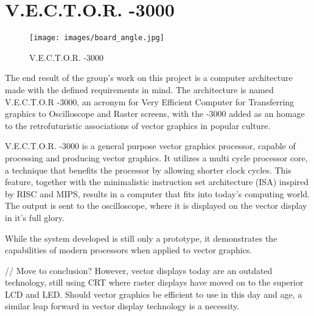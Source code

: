 \chapter{V.E.C.T.O.R. -3000}

\begin{figure}[H]
    \centering \texttt{[image: images/board\_angle.jpg]}
    \caption{V.E.C.T.O.R. -3000}
    \label{fig:board-angle}
\end{figure}

The end result of the group's work on this project is a computer architecture made with the defined requirements in mind.
The architecture is named V.E.C.T.O.R -3000, an acronym for Very Efficient Computer for Transferring graphics to Oscilloscope and Raster screens, with the -3000 added as an homage to the retrofuturistic associations of vector graphics in popular culture.

V.E.C.T.O.R. -3000 is a general purpose vector graphics processor, capable of processing and producing vector graphics. 
It utilizes a multi cycle processor core, a technique that benefits the processor by allowing shorter clock cycles.
This feature, together with the minimalistic instruction set architecture (ISA) inspired by RISC\cite{risc} and MIPS\cite{mips}, results in a computer that fits into today's computing world.
The output is sent to the oscilloscope, where it is displayed on the vector display in it's full glory.

While the system developed is still only a prototype, it demonstrates the capabilities of modern processors when applied to vector graphics. 


// Move to conclusion?
However, vector displays today are an outdated technology, still using CRT where raster displays have moved on to the superior LCD and LED.
Should vector graphics be efficient to use in this day and age, a similar leap forward in vector display technology is a necessity.

